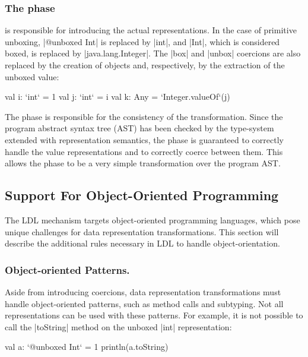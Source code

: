 \subsubsection{The \commit{} phase} is responsible for introducing the actual
representations. In the case of primitive unboxing, |@unboxed Int| is
replaced by |int|, and |Int|, which is considered boxed, is replaced
by |java.lang.Integer|. The |box| and |unbox| coercions are also
replaced by the creation of objects and, respectively, by the
extraction of the unboxed value:

\begin{lstlisting-nobreak}
val i: `int` = 1
val j: `int` = i
val k: Any = `Integer.valueOf`(j)
\end{lstlisting-nobreak}

The \commit{} phase is responsible for the consistency of the transformation. Since the program abstract syntax tree (AST) has been checked by the type-system extended with representation semantics, the \commit{} phase is guaranteed to correctly handle the value representations and to correctly coerce between them. This allows the \commit{} phase to be a very simple transformation over the program AST.

\subsection{Support For Object-Oriented Programming}
\label{sec:ldl:oo-patterns}

The LDL mechanism targets object-oriented programming languages, which pose unique challenges for data representation transformations. This section will describe the additional rules necessary in LDL to handle object-orientation.

\subsubsection{Object-oriented Patterns.} Aside from introducing coercions, data representation transformations must handle object-oriented patterns, such as method calls and subtyping. Not all representations can be used with these patterns. For example, it is not possible to call the |toString| method on the unboxed |int| representation:

\begin{lstlisting-nobreak}
val a: `@unboxed Int` = 1
println(a.toString)
\end{lstlisting-nobreak}

